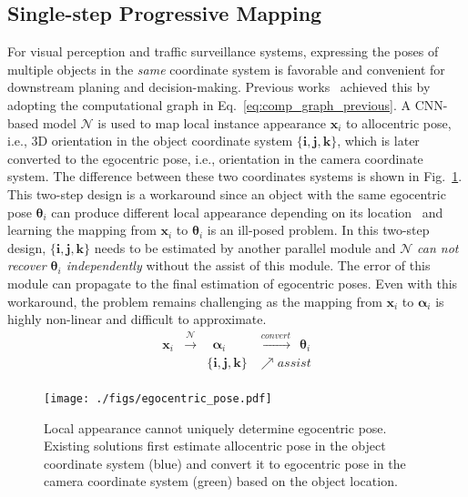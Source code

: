 \documentclass[final]{cvpr}
\begin{document}
\subsection{Single-step Progressive Mapping}
\label{Ego-Net}
For visual perception and traffic surveillance systems, expressing the poses of multiple objects in the \emph{same} coordinate system is favorable and convenient for downstream planing and decision-making. Previous works~\cite{mousavian20173d, kundu20183d, brazil2019m3d, Ding_2020_CVPR} achieved this by adopting the computational graph in Eq.~\ref{eq:comp_graph_previous}. A CNN-based model $\mathcal{N}$ is used to map local instance appearance $\mathbf{x}_i$ to allocentric pose, i.e., 3D orientation in the object coordinate system $\{\mathbf{i}, \mathbf{j}, \mathbf{k}\}$, which is later converted to the egocentric pose, i.e., orientation in the camera coordinate system. The difference between these two coordinates systems is shown in Fig.~\ref{fig:3.1}. This two-step design is a workaround since an object with the same egocentric pose $\bm{\theta}_i$ can produce different local appearance depending on its location~\cite{kundu20183d} and learning the mapping from $\mathbf{x}_i$ to $\bm{\theta}_i$ is an ill-posed problem. In this two-step design, $\{\mathbf{i}, \mathbf{j}, \mathbf{k}\}$ needs to be estimated by another parallel module and $\mathcal{N}$ \emph{can not recover $\bm{\theta}_i$ independently} without the assist of this module. The error of this module can propagate to the final estimation of egocentric poses. Even with this workaround, the problem remains challenging as the mapping from $\mathbf{x}_i$ to $\bm{\alpha}_i$ is highly non-linear and difficult to approximate.
\begin{equation}
\label{eq:comp_graph_previous}
\begin{array}{llll}
\mathbf{x}_i  & \xrightarrow{\mathcal{N}} & ~~ \bm{\alpha}_i & \xrightarrow{convert} ~~ \bm{\theta}_i \\
& & \{\mathbf{i}, \mathbf{j}, \mathbf{k}\} & \nearrow{assist}\\
\end{array}
\end{equation}

\begin{figure}[h]
	\begin{center}
		\texttt{[image: ./figs/egocentric\_pose.pdf]}
	\end{center}
	\caption{Local appearance cannot uniquely determine egocentric pose. Existing solutions first estimate allocentric pose in the object coordinate system (blue) and convert it to egocentric pose in the camera coordinate system (green) based on the object location.}
	\label{fig:3.1}
\end{figure}
\end{document}
